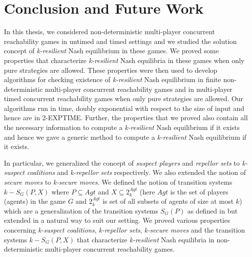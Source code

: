 \chapter{Conclusion and Future Work}
In this thesis, we considered non-deterministic multi-player concurrent reachability games in untimed and timed settings and we studied the solution concept of \textit{k-resilient} Nash equilibrium in these games. We proved some properties that characterize \textit{k-resilient} Nash equilibria in these games when only pure strategies are allowed. These properties were then used to develop algorithms for checking existence of \textit{k-resilient} Nash equilibrium in finite non-deterministic multi-player concurrent reachability games and in multi-player timed concurrent reachability games when only pure strategies are allowed. Our algorithms run in time, doubly exponential with respect to the size of input and hence are in 2-EXPTIME. Further, the properties that we proved also contain all the necessary information to compute a \textit{k-resilient} Nash equilibrium if it exists and hence we gave a generic method to compute a \textit{k-resilient} Nash equilibrium if it exists.

In particular, we generalized the concept of \textit{suspect players} \cite{BBM-concur10,BBM-report,BBMU-fsttcs11,Romain-phd} and \textit{repellor sets} \cite{BBM-concur10,BBM-report,BBMU-fsttcs11} to \textit{k-suspect coalitions} and \textit{k-repellor sets} respectively. We also extended the notion of \textit{secure moves} \cite{BBM-concur10,BBM-report} to \textit{k-secure moves}. We defined the notion of transition systems $k-S_{G}(P, X)$ where $P \subseteq Agt$ and $X \subseteq 2^{Agt}_{k}$ (here $Agt$ is the set of players (agents) in the game $G$ and $2^{Agt}_{k}$ is set of all subsets of agents of size at most $k$) which are a generalization of the transition systems $S_{G}(P)$ as defined in \cite{BBM-concur10,BBM-report} but extended in a natural way to suit our setting. We proved various properties concerning \textit{k-suspect coalitions}, \textit{k-repellor sets}, \textit{k-secure moves} and the transition systems $k-S_{G}(P, X)$ that characterize \textit{k-resilient} Nash equilibria in non-deterministic multi-player concurrent reachability games.

